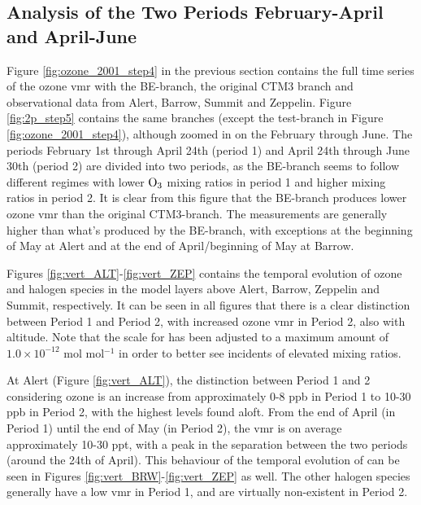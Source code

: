 \subsection{Analysis of the Two Periods February-April and April-June}\label{sec:res_twoPeriods}

Figure \ref{fig:ozone_2001_step4} in the previous section contains the full time series of the ozone \acrshort{vmr} with the BE-branch, the original CTM3 branch and observational data from Alert, Barrow, Summit and Zeppelin. Figure \ref{fig:2p_step5} contains the same branches (except the test-branch in Figure \ref{fig:ozone_2001_step4}), although zoomed in on the February through June. The periods February 1st through April 24th (period 1) and April 24th through June 30th (period 2) are divided into two periods, as the BE-branch seems to follow different regimes with lower $\mathrm{O_3}$ mixing ratios in period 1 and higher mixing ratios in period 2. It is clear from this figure that the BE-branch produces lower ozone \acrshort{vmr} than the original CTM3-branch. The measurements are generally higher than what's produced by the BE-branch, with exceptions at the beginning of May at Alert and at the end of April/beginning of May at Barrow.

%


\medskip

Figures \ref{fig:vert_ALT}-\ref{fig:vert_ZEP} contains the temporal evolution of ozone and halogen species in the model layers above Alert, Barrow, Zeppelin and Summit, respectively. It can be seen in all figures that there is a clear distinction between Period 1 and Period 2, with increased ozone \acrshort{vmr} in Period 2, also with altitude. Note that the scale for  has been adjusted to a maximum amount of $1.0\times10^{-12}$ mol mol$^{-1}$ in order to better see incidents of elevated  mixing ratios.

\medskip

At Alert (Figure \ref{fig:vert_ALT}), the distinction between Period 1 and 2 considering ozone is an increase from approximately 0-8 ppb in Period 1 to 10-30 ppb in Period 2, with the highest levels found aloft. From the end of April (in Period 1) until the end of May (in Period 2), the  \acrshort{vmr} is on average approximately 10-30 ppt, with a peak in the separation between the two periods (around the 24th of April). This behaviour of the temporal evolution of  can be seen in Figures \ref{fig:vert_BRW}-\ref{fig:vert_ZEP} as well. The other halogen species generally have a low \acrshort{vmr} in Period 1, and are virtually non-existent in Period 2. 

